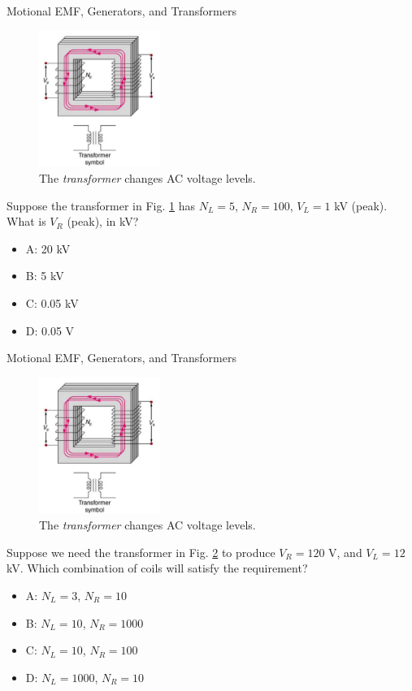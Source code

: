 \documentclass{beamer}
\begin{document}
\begin{frame}{Motional EMF, Generators, and Transformers}
\begin{figure}
\centering
\includegraphics[width=0.35\textwidth,trim=0cm 5cm 0cm 0cm,clip=true]{figures/transformer.png}
\caption{\label{fig:trans2} The \textit{transformer} changes AC voltage levels.}
\end{figure}
Suppose the transformer in Fig. \ref{fig:trans2} has $N_L = 5$, $N_R = 100$, $V_L = 1$ kV (peak).  What is $V_R$ (peak), in kV?
\begin{itemize}
\item A: 20 kV
\item B: 5 kV
\item C: 0.05 kV
\item D: 0.05 V
\end{itemize}
\end{frame}

\begin{frame}{Motional EMF, Generators, and Transformers}
\begin{figure}
\centering
\includegraphics[width=0.35\textwidth,trim=0cm 5cm 0cm 0cm,clip=true]{figures/transformer.png}
\caption{\label{fig:trans3} The \textit{transformer} changes AC voltage levels.}
\end{figure}
\footnotesize
Suppose we need the transformer in Fig. \ref{fig:trans3} to produce $V_R = 120$ V, and $V_L = 12$ kV.  Which combination of coils will satisfy the requirement?
\begin{itemize}
\item A: $N_L = 3$, $N_R = 10$
\item B: $N_L = 10$, $N_R = 1000$
\item C: $N_L = 10$, $N_R = 100$
\item D: $N_L = 1000$, $N_R = 10$
\end{itemize}
\end{frame}
\end{document}
